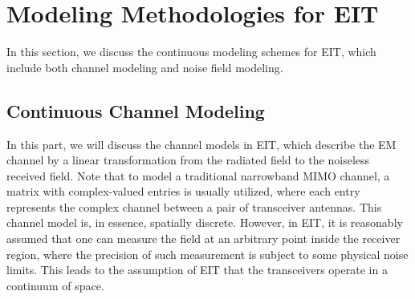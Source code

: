 \documentclass[journal,twocolumn]{IEEEtran}
\begin{document}


\section{Modeling Methodologies for EIT}
In this section, we discuss the continuous modeling schemes for EIT, which include both channel modeling and noise field modeling. 

\vspace{-1em}
\subsection{Continuous Channel Modeling}
In this part, we will discuss the channel models in EIT, which describe the EM channel by a linear transformation from the radiated field to the noiseless received field.  
Note that to model a traditional narrowband MIMO channel, a matrix with complex-valued entries is usually utilized, where each entry represents the complex channel between a pair of transceiver antennas. 
This channel model is, in essence, spatially discrete. 
However, in EIT, it is reasonably assumed that one can measure the field at an arbitrary point inside the receiver region, where the precision of such measurement is subject to some physical noise limits. This leads to the assumption of EIT that the transceivers operate in a continuum of space.  
\end{document}
